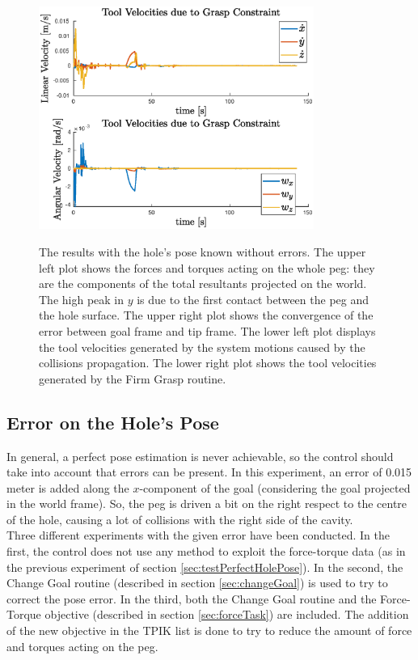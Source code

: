 \begin{figure}[H]
{		\includegraphics[width=9cm]{NOERROR/grasp.eps}
	}
	\caption[Plots with perfectly known Hole's pose]{The results with the hole's pose known without errors. The upper left plot shows the forces and torques acting on the whole peg: they are the components of the total resultants projected on the world. The high peak in $y$ is due to the first contact between the peg and the hole surface. The upper right plot shows the convergence of the error between goal frame and tip frame. The lower left plot displays the tool velocities generated by the system motions caused by the collisions propagation. The lower right plot shows the tool velocities generated by the Firm Grasp routine.}
	\label{fig:noErrorPlots}
\end{figure}


\subsection{Error on the Hole's Pose}
\label{subsec:resultsControlError}
In general, a perfect pose estimation is never achievable, so the control should take into account that errors can be present. In this experiment, an error of 0.015 meter is added along the $x$-component of the goal (considering the goal projected in the world frame). So, the peg is driven a bit on the right respect to the centre of the hole, causing a lot of collisions with the right side of the cavity.\\

Three different experiments with the given error have been conducted. In the first, the control does not use any method to exploit the force-torque data (as in the previous experiment of section \ref{sec:testPerfectHolePose}). In the second, the Change Goal routine (described in section \ref{sec:changeGoal}) is used to try to correct the pose error. In the third, both the Change Goal routine and the Force-Torque objective (described in section \ref{sec:forceTask}) are included. The addition of the new objective in the TPIK list is done to try to reduce the amount of force and torques acting on the peg.

